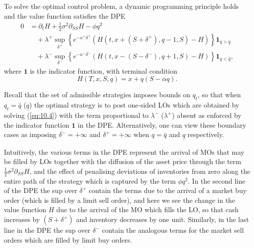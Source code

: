 \documentclass[11pt, a4paper]{book}
\newcommand{\Ind}{\mathbf{1}}
\begin{document}
	To solve the optimal control problem, a dynamic programming principle holds and the value function satisfies the DPE
	\begin{equation}
		\begin{aligned}
			0 &= \partial_t H + \tfrac{1}{2}\sigma^2 \partial_{SS} H - \phi q^2 \\
			&\quad + \lambda^+ \sup_{\delta^+} \left\{ e^{-\kappa^+ \delta^+} \left( H(t, x + (S + \delta^+), q - 1, S) - H \right) \right\} \Ind_{q > \underline{q}} \\
			&\quad + \lambda^- \sup_{\delta^-} \left\{ e^{-\kappa^- \delta^-} \left( H(t, x - (S - \delta^-), q + 1, S) - H \right) \right\} \Ind_{q < \bar{q}},
		\end{aligned} \label{eq:10.4}
	\end{equation}
	where $\Ind$ is the indicator function, with terminal condition
	\begin{equation}
		H(T, x, S, q) = x + q(S - \alpha q). \label{eq:10.5}
	\end{equation}
	
	Recall that the set of admissible strategies imposes bounds on $q_t$, so that when $q_t = \bar{q}$ ($\underline{q}$) the optimal strategy is to post one-sided LOs which are obtained by solving (\ref{eq:10.4}) with the term proportional to $\lambda^-$ ($\lambda^+$) absent as enforced by the indicator function $\Ind$ in the DPE. Alternatively, one can view these boundary cases as imposing $\delta^- = +\infty$ and $\delta^+ = +\infty$ when $q = \bar{q}$ and $\underline{q}$ respectively.
	
	Intuitively, the various terms in the DPE represent the arrival of MOs that may be filled by LOs together with the diffusion of the asset price through the term $\tfrac{1}{2}\sigma^2 \partial_{SS} H$, and the effect of penalising deviations of inventories from zero along the entire path of the strategy which is captured by the term $\phi q^2$. In the second line of the DPE the sup over $\delta^+$ contain the terms due to the arrival of a market buy order (which is filled by a limit sell order), and here we see the change in the value function $H$ due to the arrival of the MO which fills the LO, so that cash increases by $(S+\delta^+)$ and inventory decreases by one unit. Similarly, in the last line in the DPE the sup over $\delta^-$ contain the analogous terms for the market sell orders which are filled by limit buy orders.
	
\end{document}
